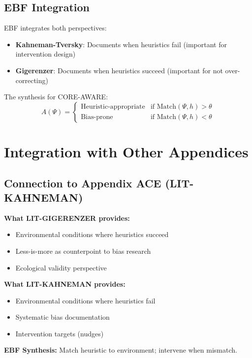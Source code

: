 \subsection{EBF Integration}

EBF integrates both perspectives:
\begin{itemize}[nosep]
\item \textbf{Kahneman-Tversky}: Documents when heuristics fail (important for intervention design)
\item \textbf{Gigerenzer}: Documents when heuristics succeed (important for not over-correcting)
\end{itemize}

The synthesis for CORE-AWARE:
\begin{equation}
A(\Psi) = \begin{cases}
\text{Heuristic-appropriate} & \text{if } \text{Match}(\Psi, h) > \theta \\
\text{Bias-prone} & \text{if } \text{Match}(\Psi, h) < \theta
\end{cases}
\end{equation}


\section{Integration with Other Appendices}
\label{sec:gi-integration}

\subsection{Connection to Appendix ACE (LIT-KAHNEMAN)}

\begin{tcolorbox}[colback=yellow!5!white, colframe=yellow!75!black,
    title=Integration: LIT-GIGERENZER $\leftrightarrow$ LIT-KAHNEMAN]
\textbf{What LIT-GIGERENZER provides:}
\begin{itemize}[nosep]
\item Environmental conditions where heuristics succeed
\item Less-is-more as counterpoint to bias research
\item Ecological validity perspective
\end{itemize}

\textbf{What LIT-KAHNEMAN provides:}
\begin{itemize}[nosep]
\item Environmental conditions where heuristics fail
\item Systematic bias documentation
\item Intervention targets (nudges)
\end{itemize}

\textbf{EBF Synthesis:} Match heuristic to environment; intervene when mismatch.
\end{tcolorbox}

